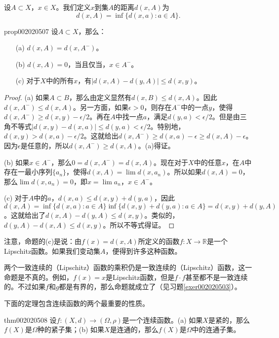 设$A \subset X$，$x \in X$。我们定义$x$到集$A$的距离$d(x, A)$为
\[
d(x, A) = \inf\{d(x, a) : a \in A\}.
\]

\begin{proposition}{}{prop002020507}
设$A \subset X$，那么：
\begin{enumerate}
\item[(a)]$d(x, A) = d(x, A^-)$。
\item[(b)]$d(x, A) = 0$，当且仅当，$x \in A^-$。
\item[(c)]对于$X$中的所有$x$，有$|d(x, A) - d(y, A)| \le d(x, y)$。
\end{enumerate}
\end{proposition}

\begin{proof}
(a) 如果$A \subset B$，那么由定义显然有$d(x, B) \le d(x, A)$。因此$d(x, A^-) \le d(x, A)$。另一方面，如果$\epsilon > 0$，则存在$A^-$中的一点$y$，使得$d(x, A^-) \ge d(x, y) - \epsilon / 2$。再在$A$中找一点$a$，满足$d(y, a) < \epsilon/2$。但是由三角不等式$|d(x, y) - d(x, a)| \le d(y, a) < \epsilon/2$。特别地，$d(x, y) > d(x, a) - \epsilon/2$。这就给出$d(x, A^-) \ge d(x, a) - \epsilon \ge d(x, A) - \epsilon$。因为$\epsilon$是任意的，所以$d(x, A^-) \ge d(x, A)$。(a)得证。

(b) 如果$x \in A^-$，那么$0 = d(x, A^-) = d(x, A)$。现在对于$X$中的任意$x$，在$A$中存在一最小序列$\{a_n\}$，使得$d(x, A) = \lim{d(x, a_n)}$。所以如果$d(x, A) = 0$，那么$\lim{d(x, a_n)} = 0$，即$x = \lim{a_n}$，$x \in A^-$。

(c) 对于$A$中的$a$，$d(x, a) \le d(x, y) + d(y, a)$，因此$d(x, A) = \inf\{d(x, a):a \in A\} \inf\{d(x, y) + d(y, a):a \in A\} = d(x, y) + d(y, A)$。这就给出了$d(x, A) - d(y, A) \le d(x, y)$。类似的，$d(y, A) - d(x, A) \le d(x, y)$。所以不等式得证。
\end{proof}

注意，命题的(c)是说：由$f(x)=d(x, A)$所定义的函数$f: X \to \mathbb{R}$是一个Lipschitz函数。如果我们变动集$A$，便得到许多这种函数。

两个一致连续的（Lipschitz）函数的乘积仍是一致连续的（Lipschitz）函数，这一命题是不真的。例如，$f(x)=x$是Lipschitz函数，但是$f \cdot f$甚至都不是一致连续的。不过如果$f$和$g$都是有界的，那么命题就成立了（见习题\ref{exer002020503}）。

下面的定理包含连续函数的两个最重要的性质。

\begin{theorem}{}{thm002020508}
设$f:(X, d) \to (\Omega, \rho)$是一个连续函数。(a) 如果$X$是紧的，那么$f(X)$是$\Omega$种的紧子集；(b) 如果$X$是连通的，那么$f(X)$是$\Omega$中的连通子集。
\end{theorem}

